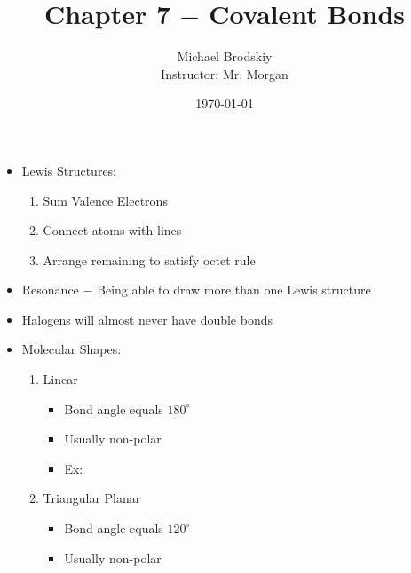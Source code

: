 \documentclass[12pt]{article}
\title{Chapter 7 $-$ Covalent Bonds}
\date{\today}
\author{Michael Brodskiy\\ \small Instructor: Mr. Morgan}
\begin{document}
\maketitle

\begin{itemize}

  \item Lewis Structures:

    \begin{enumerate}

      \item Sum Valence Electrons

      \item Connect atoms with lines

      \item Arrange remaining  to satisfy octet rule

    \end{enumerate}

  \item Resonance $-$ Being able to draw more than one Lewis structure

  \item Halogens will almost never have double bonds

  \item Molecular Shapes:

    \begin{enumerate}

      \item Linear

        \begin{itemize}

          \item Bond angle equals $180^{\circ}$

          \item Usually non-polar

          \item Ex:


        \end{itemize}

      \item Triangular Planar

        \begin{itemize}

          \item Bond angle equals $120^{\circ}$

          \item Usually non-polar


\end{itemize}
\end{enumerate}
\end{itemize}
\end{document}
